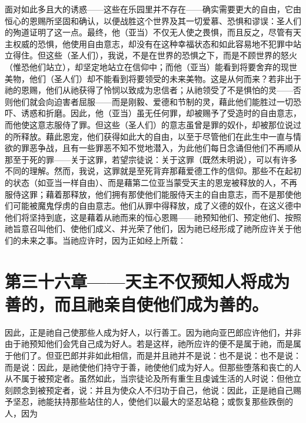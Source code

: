 面对如此多且大的诱惑——这些在乐园里并不存在——确实需要更大的自由，它由恒心的恩赐所坚固和确认，以便战胜这个世界及其一切爱慕、恐惧和谬误：圣人们的殉道证明了这一点。最终，他（亚当）不仅无人使之畏惧，而且反之，尽管有天主权威的恐惧，他使用自由意志，却没有在这种幸福状态和如此容易地不犯罪中站立得住。但这些（圣人们），我说，不是在世界的恐惧之下，而是不顾世界的怒火（惟恐他们站立），却坚定地站立在信仰中；而他（亚当）能看到将要舍弃的现世美物，他们（圣人们）却不能看到将要领受的未来美物。这是从何而来？若非出于祂的恩赐，他们从祂获得了怜悯以致成为忠信者；从祂领受了不是惧怕的灵——否则他们就会向迫害者屈服——而是刚毅、爱德和节制的灵，藉此他们能胜过一切恐吓、诱惑和折磨。因此，他（亚当）虽无任何罪，却被赐予了受造时的自由意志，而他使这意志服侍了罪。但这些（圣人们）的意志虽曾是罪的奴仆，却被那位说过的所释放。藉此恩宠，他们获得如此大的自由，以至于尽管他们在此生中一直与情欲的罪恶争战，且有一些罪恶不知不觉地潜入，为此他们每日念诵但他们不再顺从那至于死的罪——关于这罪，若望宗徒说：关于这罪（既然未明说），可以有许多不同的理解。然而，我说，这罪就是至死背弃那藉爱德工作的信仰。那些不在起初的状态（如亚当一样自由）、而是藉第二位亚当蒙受天主的恩宠被释放的人，不再服侍这罪；藉着那释放，他们拥有那使他们能服侍天主的自由意志，而不是那使他们可能被魔鬼俘虏的自由意志。他们从罪中得释放，成了义德的奴仆，在这义德中他们将坚持到底，这是藉着从祂而来的恒心恩赐——祂预知他们、预定他们、按照祂旨意召叫他们、使他们成义、并光荣了他们，因为祂已经形成了祂所应许关于他们的未来之事。当祂应许时，因为正如经上所载：\par


\section{第三十六章——天主不仅预知人将成为善的，而且祂亲自使他们成为善的。}

因此，正是祂自己使那些人成为好人，以行善工。因为祂向亚巴郎应许他们，并非由于祂预知他们会凭自己成为好人。若是这样，祂所应许的便不是属于祂，而是属于他们了。但亚巴郎并非如此相信，而是并且祂并不是说：也不是说：也不是说：而是说：因此，是祂使他们持守于善，祂使他们成为好人。但那些堕落和丧亡的人从不属于被预定者。虽然如此，当宗徒论及所有重生且虔诚生活的人时说：但他立刻顾念到被预定者，说：并且为使众人不归功于自己，他说：因此，正是祂自己赐予坚忍，祂能扶持那些站住的人，使他们以最大的坚忍站稳；或恢复那些跌倒的人，因为\par

